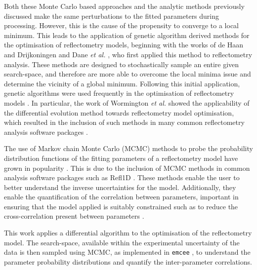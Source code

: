 Both these Monte Carlo based approaches and the analytic methods previously discussed make the same perturbations to the fitted parameters during processing.
However, this is the cause of the propensity to converge to a local minimum.
This leads to the application of genetic algorithm derived methods for the optimisation of reflectometry models, beginning with the works of de Haan and Drijkoningen \cite{de_haan_genetic_1994} and Dane \emph{et al.} \cite{dane_application_1998}, who first applied this method to reflectometry analysis.
These methods are designed to stochastically sample an entire given search-space, and therefore are more able to overcome the local minima issue and determine the vicinity of a global minimum.
Following this initial application, genetic algorithms were used frequently in the optimisation of reflectometry models \cite{ulyanenkov_genetic_2000,ulyanenkov_extended_2005,politsch_unbiased_2002,wormington_characterization_1999}.
In particular, the work of Wormington \emph{et al.} \cite{wormington_characterization_1999} showed the applicability of the differential evolution method towards reflectometry model optimisation, which resulted in the inclusion of such methods in many common reflectometry analysis software packages \cite{bjorck_fitting_2011,bjorck_genx_2007,nelson_co-refinement_2006,nelson_refnx_2019,ott_simulreflec_nodate,kienzle_ncnr_nodate}.

The use of Markov chain Monte Carlo (MCMC) methods to probe the probability distribution functions of the fitting parameters of a reflectometry model have grown in popularity \cite{gil_limitations_2012,hoogerheide_structure_2018,owejan_solid_2012,heinrich_myristoylation_2014}.
This is due to the inclusion of MCMC methods in common analysis software packages such as Refl1D \cite{kienzle_ncnr_nodate}.
These methods enable the user to better understand the inverse uncertainties for the model.
Additionally, they enable the quantification of the correlation between parameters, important in ensuring that the model applied is suitably constrained such as to reduce the cross-correlation present between parameters \cite{nelson_co-refinement_2006}.

This work applies a differential algorithm \cite{storn_differential_1997,jones_scipy_nodate} to the optimisation of the reflectometry model.
The search-space, available within the experimental uncertainty of the data is then sampled using MCMC, as implemented in \texttt{emcee} \cite{foreman-mackey_emcee_2013}, to understand the parameter probability distributions and quantify the inter-parameter correlations.

